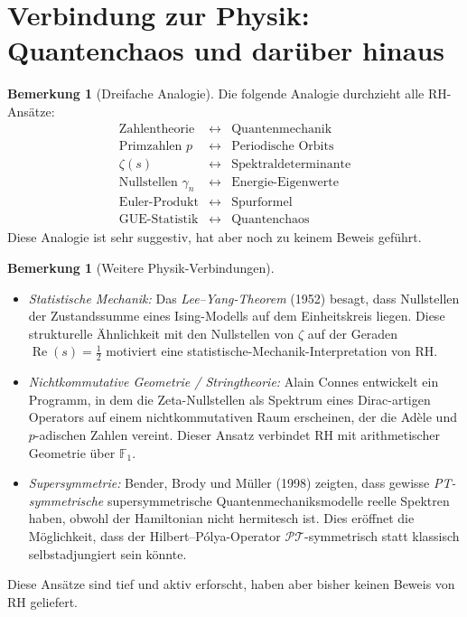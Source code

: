 \documentclass[12pt,a4paper]{amsart}
\theoremstyle{definition}
\newtheorem{remark}[theorem]{Bemerkung}
\DeclareMathOperator{\Re}{Re}
\begin{document}
\section{Verbindung zur Physik: Quantenchaos und dar\"uber hinaus}

\begin{remark}[Dreifache Analogie]
Die folgende Analogie durchzieht alle RH-Ans\"atze:
\[
\begin{array}{ccc}
  \text{Zahlentheorie} & \longleftrightarrow & \text{Quantenmechanik} \\
  \hline
  \text{Primzahlen } p & \longleftrightarrow & \text{Periodische Orbits} \\
  \zeta(s) & \longleftrightarrow & \text{Spektraldeterminante} \\
  \text{Nullstellen } \gamma_n & \longleftrightarrow & \text{Energie-Eigenwerte} \\
  \text{Euler-Produkt} & \longleftrightarrow & \text{Spurformel} \\
  \text{GUE-Statistik} & \longleftrightarrow & \text{Quantenchaos}
\end{array}
\]
Diese Analogie ist sehr suggestiv, hat aber noch zu keinem Beweis gef\"uhrt.
\end{remark}

\begin{remark}[Weitere Physik-Verbindungen]
\begin{itemize}
  \item \textit{Statistische Mechanik:} Das \emph{Lee--Yang-Theorem} (1952)
    besagt, dass Nullstellen der Zustandssumme eines Ising-Modells auf dem
    Einheitskreis liegen.  Diese strukturelle \"Ahnlichkeit mit den Nullstellen
    von $\zeta$ auf der Geraden $\Re(s) = \tfrac{1}{2}$ motiviert eine
    statistische-Mechanik-Interpretation von RH.
  \item \textit{Nichtkommutative Geometrie / Stringtheorie:} Alain Connes
    \cite{Connes1999} entwickelt ein Programm, in dem die Zeta-Nullstellen
    als Spektrum eines Dirac-artigen Operators auf einem nichtkommutativen
    Raum erscheinen, der die Ad\`ele und $p$-adischen Zahlen vereint.
    Dieser Ansatz verbindet RH mit arithmetischer Geometrie \"uber $\mathbb{F}_1$.
  \item \textit{Supersymmetrie:} Bender, Brody und M\"uller (1998) zeigten,
    dass gewisse \emph{PT-symmetrische} supersymmetrische Quantenmechaniksmodelle
    reelle Spektren haben, obwohl der Hamiltonian nicht hermitesch ist.
    Dies er\"offnet die M\"oglichkeit, dass der Hilbert--P\'olya-Operator
    $\mathcal{P}\mathcal{T}$-symmetrisch statt klassisch selbstadjungiert sein k\"onnte.
\end{itemize}
Diese Ans\"atze sind tief und aktiv erforscht, haben aber bisher keinen
Beweis von RH geliefert.
\end{remark}
\end{document}
